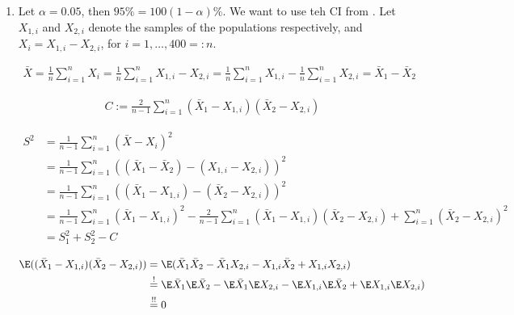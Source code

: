 \begin{solution}

\phantom{}

\begin{enumerate}[label = (\alph*)]
    \item Let $\alpha = 0.05$, then $95 \% = 100 (1 - \alpha) \%$.
    We want to use teh CI from \cite[lecture 9, slide 10]{EStat}.
    Let $X_{1, i}$ and $X_{2, i}$ denote the samples of the populations respectively, and $X_i = X_{1, i} - X_{2, i}$, for $i = 1, \dots, 400 =: n$.

    \begin{align*}
        \bar X
        =
        \frac{1}{n} \sum_{i=1}^n X_i
        =
        \frac{1}{n} \sum_{i=1}^n X_{1, i} - X_{2, i}
        =
        \frac{1}{n} \sum_{i=1}^n X_{1, i}
        -
        \frac{1}{n} \sum_{i=1}^n X_{2, i}
        =
        \bar X_1 - \bar X_2
    \end{align*}

    \begin{align*}
        C := \frac{2}{n-1} \sum_{i=1}^n (\bar X_1 - X_{1, i}) (\bar X_2 - X_{2, i})
    \end{align*}

    \begin{align*}
        S^2
        & =
        \frac{1}{n-1}
        \sum_{i=1}^n
            (\bar X - X_i)^2 \\
        & =
        \frac{1}{n-1}
        \sum_{i=1}^n
            ((\bar X_1 - \bar X_2) - (X_{1, i} - X_{2, i}))^2 \\
        & =
        \frac{1}{n-1}
        \sum_{i=1}^n
            ((\bar X_1 - X_{1, i}) - (\bar X_2 - X_{2, i}))^2 \\
        & =
        \frac{1}{n-1}
        \sum_{i=1}^n
            (\bar X_1 - X_{1, i})^2
        -
        \frac{2}{n-1}
        \sum_{i=1}^n
            (\bar X_1 - X_{1, i}) (\bar X_2 - X_{2, i})
        +
        \sum_{i=1}^n
            (\bar X_2 - X_{2, i})^2 \\
        & =
        S_1^2 + S_2^2 - C
    \end{align*}

    \begin{align*}
        \E((\bar X_1 - X_{1, i}) (\bar X_2 - X_{2, i}))
        & =
        \E(\bar X_1 \bar X_2 - \bar X_1 X_{2, i} - X_{1, i} \bar X_2 + X_{1, i} X_{2, i}) \\
        & \stackrel{!}{=}
        \E \bar X_1 \E \bar X_2 - \E \bar X_1 \E X_{2, i} - \E X_{1, i} \E \bar X_2 + \E X_{1, i} \E X_{2, i}) \\
        & \stackrel{!!}{=}
        0
    \end{align*}


\end{enumerate}
\end{solution}
